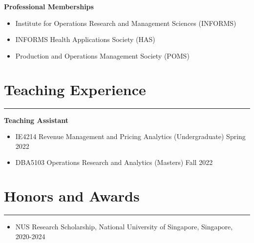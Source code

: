 \documentclass[12pt, a4paper]{article}
\begin{document}
{\raggedright\textbf{Professional Memberships}

\begin{itemize}[leftmargin=26pt, itemsep=2pt, parsep=0pt, topsep=-0.5em]
	\item Institute for Operations Research and Management Sciences (INFORMS)
	\item INFORMS Health Applications Society (HAS)
	\item Production and Operations Management Society (POMS)
\end{itemize}




\section*{Teaching Experience}
\vspace*{0.4em}
\hrule height 0.5pt

\raggedright\textbf{Teaching Assistant}
\begin{itemize}[leftmargin=26pt, itemsep=2pt, parsep=0pt, topsep=-0.5em]

	\item IE4214 Revenue Management and Pricing Analytics (Undergraduate) \hfill Spring 2022

	\item DBA5103 Operations Research and Analytics (Masters) \hfill Fall 2022

\end{itemize}




\section*{Honors and Awards}
\vspace*{0.4em}
\hrule height 0.5pt
\begin{itemize}[leftmargin=26pt, itemsep=1pt, parsep=0.5pt, topsep=1pt]

	\item NUS Research Scholarship, National University of Singapore, Singapore, 2020-2024
	

\end{itemize}}
\end{document}
